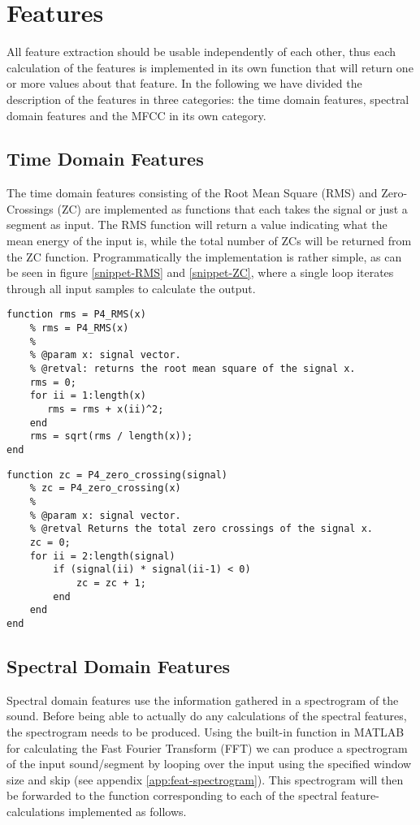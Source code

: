 \section{Features}
All feature extraction should be usable independently of each other, thus each calculation of the features is implemented in its own function that will return one or more values about that feature. In the following we have divided the description of the features in three categories: the time domain features, spectral domain features and the MFCC in its own category.

\subsection{Time Domain Features}
The time domain features consisting of the Root Mean Square (RMS) and Zero-Crossings (ZC) are implemented as functions that each takes the signal or just a segment as input. The RMS function will return a value indicating what the mean energy of the input is, while the total number of ZCs will be returned from the ZC function. Programmatically the implementation is rather simple, as can be seen in figure \ref{snippet-RMS} and \ref{snippet-ZC}, where a single loop iterates through all input samples to calculate the output.

\begin{lstlisting}[caption=Matlab implementation of the RMS algorithm., label=snippet-RMS]
function rms = P4_RMS(x)
    % rms = P4_RMS(x)
    %
    % @param x: signal vector.
    % @retval: returns the root mean square of the signal x.
    rms = 0;
    for ii = 1:length(x)
       rms = rms + x(ii)^2; 
    end
    rms = sqrt(rms / length(x));
end
\end{lstlisting}

\begin{lstlisting}[caption=Matlab implementation of the ZC algorithm., label=snippet-ZC]
function zc = P4_zero_crossing(signal)
    % zc = P4_zero_crossing(x)
    %
    % @param x: signal vector.
    % @retval Returns the total zero crossings of the signal x.
    zc = 0;
    for ii = 2:length(signal)
        if (signal(ii) * signal(ii-1) < 0)
            zc = zc + 1;
        end
    end
end
\end{lstlisting}

\subsection{Spectral Domain Features}
Spectral domain features use the information gathered in a spectrogram of the sound. Before being able to actually do any calculations of the spectral features, the spectrogram needs to be produced. Using the built-in function in MATLAB for calculating the Fast Fourier Transform (FFT) we can produce a spectrogram of the input sound/segment by looping over the input using the specified window size and skip (see appendix \ref{app:feat-spectrogram}). This spectrogram will then be forwarded to the function corresponding to each of the spectral feature-calculations implemented as follows.

